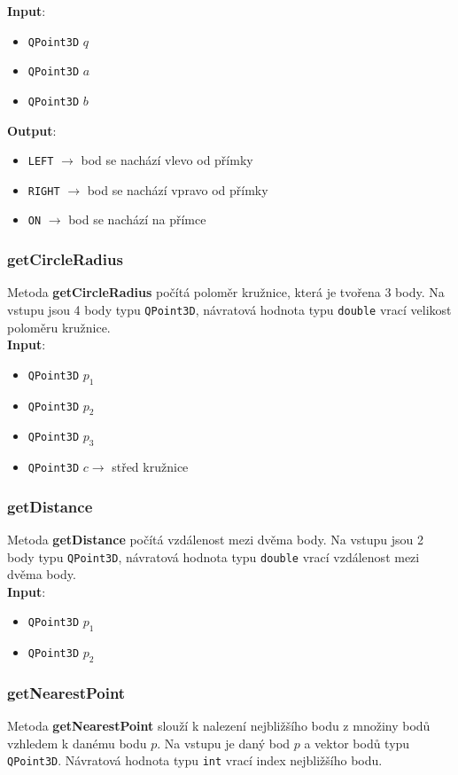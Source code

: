 \documentclass[a4paper, 12pt]{article}
\begin{document}
\textbf{Input}:
\begin{itemize}
\item \texttt{QPoint3D} $q$
\item \texttt{QPoint3D} $a$
\item \texttt{QPoint3D} $b$
\end{itemize}

\textbf{Output}:
\begin{itemize}
\item \texttt{LEFT} $\rightarrow$ bod se nachází vlevo od přímky
\item \texttt{RIGHT} $\rightarrow$ bod se nachází vpravo od přímky
\item \texttt{ON} $\rightarrow$ bod se nachází na přímce
\end{itemize}

\subsubsection*{getCircleRadius}
Metoda \textbf{getCircleRadius} počítá poloměr kružnice, která je tvořena 3 body. Na vstupu jsou 4 body typu \texttt{QPoint3D}, návratová hodnota typu \texttt{double} vrací velikost poloměru kružnice.\\ 

\textbf{Input}:
\begin{itemize}
\item \texttt{QPoint3D} $p_1$ 
\item \texttt{QPoint3D} $p_2$ 
\item \texttt{QPoint3D} $p_3$
\item \texttt{QPoint3D} $c \rightarrow$ střed kružnice
\end{itemize}

\subsubsection*{getDistance}
Metoda \textbf{getDistance} počítá vzdálenost mezi dvěma body. Na vstupu jsou 2 body typu \texttt{QPoint3D}, návratová hodnota typu \texttt{double} vrací vzdálenost mezi dvěma body.\\ 

\textbf{Input}:
\begin{itemize}
\item \texttt{QPoint3D} $p_1$ 
\item \texttt{QPoint3D} $p_2$
\end{itemize}

\subsubsection*{getNearestPoint}
Metoda \textbf{getNearestPoint} slouží k nalezení nejbližšího bodu z množiny bodů vzhledem k danému bodu $p$. Na vstupu je daný bod $p$ a vektor bodů typu \texttt{QPoint3D}. Návratová hodnota typu \texttt{int} vrací index nejbližšího bodu.
\end{document}
